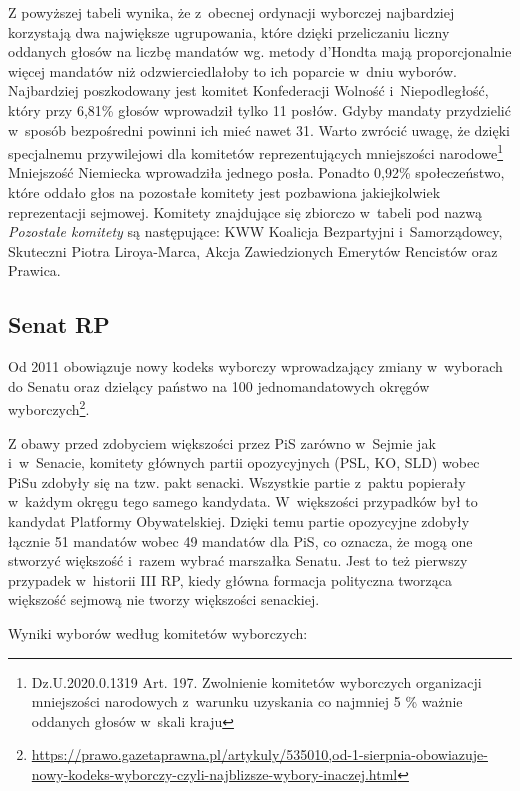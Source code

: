 Z powyższej tabeli wynika, że z~obecnej ordynacji wyborczej najbardziej korzystają dwa największe ugrupowania, które dzięki przeliczaniu liczny oddanych głosów na liczbę mandatów wg. metody d'Hondta mają proporcjonalnie więcej mandatów niż odzwierciedlałoby to ich poparcie w~dniu wyborów. Najbardziej poszkodowany jest komitet Konfederacji Wolność i~Niepodległość, który przy 6,81\% głosów wprowadził tylko 11 posłów. Gdyby mandaty przydzielić w~sposób bezpośredni powinni ich mieć nawet 31. Warto zwrócić uwagę, że dzięki specjalnemu przywilejowi dla komitetów reprezentujących mniejszości narodowe\footnote{Dz.U.2020.0.1319 Art. 197. Zwolnienie komitetów wyborczych organizacji mniejszości narodowych z~warunku uzyskania co najmniej 5 \% ważnie oddanych głosów w~skali kraju} Mniejszość Niemiecka wprowadziła jednego posła. Ponadto 0,92\% społeczeństwo, które oddało głos na pozostałe komitety jest pozbawiona jakiejkolwiek reprezentacji sejmowej. Komitety znajdujące się zbiorczo w~tabeli pod nazwą \textit{Pozostałe komitety} są następujące: KWW Koalicja Bezpartyjni i~Samorządowcy, Skuteczni Piotra Liroya-Marca, Akcja Zawiedzionych Emerytów Rencistów oraz Prawica.

\subsection{Senat RP}

Od 2011 obowiązuje nowy kodeks wyborczy wprowadzający zmiany w~wyborach do Senatu oraz dzielący państwo na 100 jednomandatowych okręgów wyborczych\footnote{\url{https://prawo.gazetaprawna.pl/artykuly/535010,od-1-sierpnia-obowiazuje-nowy-kodeks-wyborczy-czyli-najblizsze-wybory-inaczej.html}}.

Z obawy przed zdobyciem większości przez PiS zarówno w~Sejmie jak i~w~Senacie, komitety głównych partii opozycyjnych (PSL, KO, SLD) wobec PiSu zdobyły się na tzw. pakt senacki. Wszystkie partie z~paktu popierały w~każdym okręgu tego samego kandydata. W~większości przypadków był to kandydat Platformy Obywatelskiej. Dzięki temu partie opozycyjne zdobyły łącznie 51 mandatów wobec 49 mandatów dla PiS, co oznacza, że mogą one stworzyć większość i~razem wybrać marszałka Senatu. Jest to też pierwszy przypadek w~historii III RP, kiedy główna formacja polityczna tworząca większość sejmową nie tworzy większości senackiej.

Wyniki wyborów według komitetów wyborczych:

